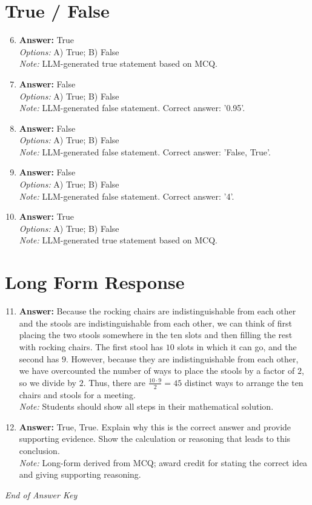 \documentclass[12pt]{article}
\begin{document}
\section*{True / False}
\begin{enumerate}[label=\arabic*.]
\setcounter{enumi}{5}
\item \textbf{Answer:} True
\\ \textit{Options:} A) True; B) False
\\ \textit{Note:} LLM-generated true statement based on MCQ.
\item \textbf{Answer:} False
\\ \textit{Options:} A) True; B) False
\\ \textit{Note:} LLM-generated false statement. Correct answer: '0.95'.
\item \textbf{Answer:} False
\\ \textit{Options:} A) True; B) False
\\ \textit{Note:} LLM-generated false statement. Correct answer: 'False, True'.
\item \textbf{Answer:} False
\\ \textit{Options:} A) True; B) False
\\ \textit{Note:} LLM-generated false statement. Correct answer: '4'.
\item \textbf{Answer:} True
\\ \textit{Options:} A) True; B) False
\\ \textit{Note:} LLM-generated true statement based on MCQ.
\end{enumerate}

\section*{Long Form Response}
\begin{enumerate}[label=\arabic*.]
\setcounter{enumi}{10}
\item \textbf{Answer:} Because the rocking chairs are indistinguishable from each other and the stools are indistinguishable from each other, we can think of first placing the two stools somewhere in the ten slots and then filling the rest with rocking chairs. The first stool has $10$ slots in which it can go, and the second has $9$. However, because they are indistinguishable from each other, we have overcounted the number of ways to place the stools by a factor of $2$, so we divide by $2$. Thus, there are $\frac{10 \cdot 9}{2} = \boxed{45}$ distinct ways to arrange the ten chairs and stools for a meeting.
\\ \textit{Note:} Students should show all steps in their mathematical solution.
\item \textbf{Answer:} True, True. Explain why this is the correct answer and provide supporting evidence. Show the calculation or reasoning that leads to this conclusion.
\\ \textit{Note:} Long-form derived from MCQ; award credit for stating the correct idea and giving supporting reasoning.
\end{enumerate}

\vfill
\noindent\textit{End of Answer Key}
\end{document}
